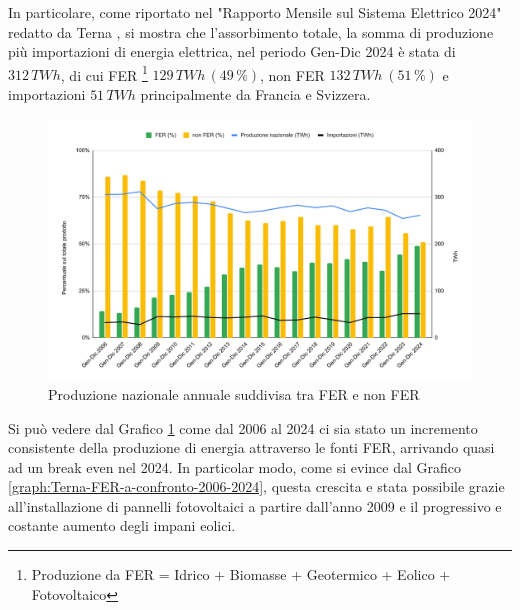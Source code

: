 In particolare, come riportato nel "Rapporto Mensile sul Sistema Elettrico 2024" redatto da Terna \cite{TernaRapporto2024}, si mostra che l'assorbimento totale, la somma di produzione più importazioni di energia elettrica, nel periodo Gen-Dic 2024 è stata di $312\,TWh$, di cui FER \footnote{Produzione da FER = Idrico + Biomasse + Geotermico + Eolico + Fotovoltaico} $129\,TWh\,(49\,\%)$, non FER $132\,TWh\ (51\,\%)$ e importazioni $51\,TWh$ principalmente da Francia e Svizzera.

\newpage
\begin{figure}[h!]
    \centering
    \includegraphics[trim= 1.1cm 0.95cm 1.15cm 1.05cm, clip, width=1\linewidth]{img/Terna-rapporto-annuale-2006-2024.pdf}
    \caption{Produzione nazionale annuale suddivisa tra FER e non FER \cite{terna-rapporto-mensile-sito}}
    \label{graph:Terna-rapporto-annuale-2006-2024}
\end{figure}

Si può vedere dal Grafico \ref{graph:Terna-rapporto-annuale-2006-2024} come dal 2006 al 2024 ci sia stato un incremento consistente della produzione di energia attraverso le fonti FER, arrivando quasi ad un break even nel 2024. In particolar modo, come si evince dal Grafico \ref{graph:Terna-FER-a-confronto-2006-2024}, questa crescita e stata possibile grazie all'installazione di pannelli fotovoltaici a partire dall'anno 2009 e il progressivo e costante aumento degli impani eolici.


